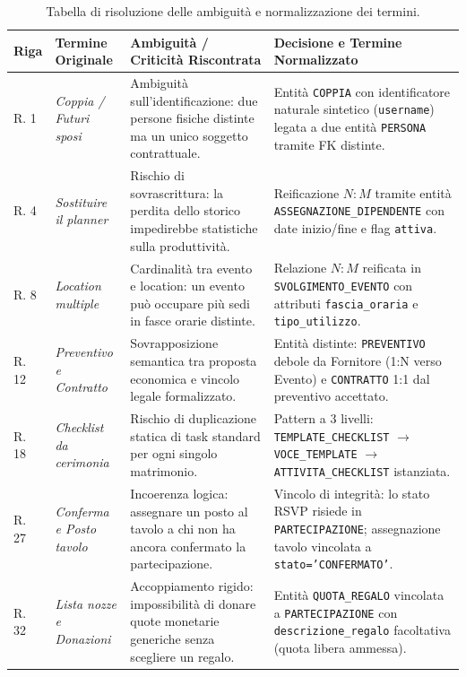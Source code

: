 \begin{table}[h!]
\centering
\small
\begin{tabularx}{\textwidth}{l p{3.2cm} p{5.5cm} X}
\toprule
\textbf{Riga} & \textbf{Termine Originale} & \textbf{Ambiguità / Criticità Riscontrata} & \textbf{Decisione e Termine Normalizzato} \\
\midrule
R. 1 & \textit{Coppia / Futuri sposi} & Ambiguità sull'identificazione: due persone fisiche distinte ma un unico soggetto contrattuale. & Entità \texttt{COPPIA} con identificatore naturale sintetico (\texttt{username}) legata a due entità \texttt{PERSONA} tramite FK distinte. \\
\addlinespace
R. 4 & \textit{Sostituire il planner} & Rischio di sovrascrittura: la perdita dello storico impedirebbe statistiche sulla produttività. & Reificazione $N:M$ tramite entità \texttt{ASSEGNAZIONE\_DIPENDENTE} con date inizio/fine e flag \texttt{attiva}. \\
\addlinespace
R. 8 & \textit{Location multiple} & Cardinalità tra evento e location: un evento può occupare più sedi in fasce orarie distinte. & Relazione $N:M$ reificata in \texttt{SVOLGIMENTO\_EVENTO} con attributi \texttt{fascia\_oraria} e \texttt{tipo\_utilizzo}. \\
\addlinespace
R. 12 & \textit{Preventivo e Contratto} & Sovrapposizione semantica tra proposta economica e vincolo legale formalizzato. & Entità distinte: \texttt{PREVENTIVO} debole da Fornitore (1:N verso Evento) e \texttt{CONTRATTO} 1:1 dal preventivo accettato. \\
\addlinespace
R. 18 & \textit{Checklist da cerimonia} & Rischio di duplicazione statica di task standard per ogni singolo matrimonio. & Pattern a 3 livelli: \texttt{TEMPLATE\_CHECKLIST} $\rightarrow$ \texttt{VOCE\_TEMPLATE} $\rightarrow$ \texttt{ATTIVITA\_CHECKLIST} istanziata. \\
\addlinespace
R. 27 & \textit{Conferma e Posto tavolo} & Incoerenza logica: assegnare un posto al tavolo a chi non ha ancora confermato la partecipazione. & Vincolo di integrità: lo stato RSVP risiede in \texttt{PARTECIPAZIONE}; assegnazione tavolo vincolata a \texttt{stato='CONFERMATO'}. \\
\addlinespace
R. 32 & \textit{Lista nozze e Donazioni} & Accoppiamento rigido: impossibilità di donare quote monetarie generiche senza scegliere un regalo. & Entità \texttt{QUOTA\_REGALO} vincolata a \texttt{PARTECIPAZIONE} con \texttt{descrizione\_regalo} facoltativa (quota libera ammessa). \\
\bottomrule
\end{tabularx}
\caption{Tabella di risoluzione delle ambiguità e normalizzazione dei termini.}
\label{tab:ambiguita}
\end{table}

